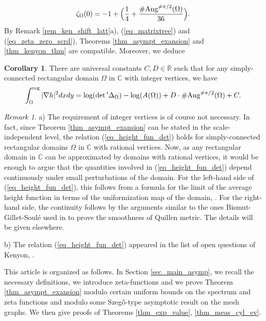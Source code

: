 \documentclass[12pt]{article}
\numberwithin{equation}{section}
\theoremstyle{theorem}
\theoremstyle{definition}
\newtheorem{cor}[thm]{Corollary}
\theoremstyle{remark}
\newtheorem{rem}[thm]{Remark}
\newcommand{\comp}{\mathbb{C}}
\newcommand{\real}{\mathbb{R}}
\newcommand{\laplcomp}{\Delta}
\begin{document}
	\begin{equation}\label{eq_zeta_zero_scrd}
		\zeta_{\Omega}(0) = -1 + 
		\Big(
			\frac{1}{4} + \frac{\# {\rm{Ang}}^{\neq \pi/2}(\Omega)}{36}
		\Big).
	\end{equation}
	By Remark \ref{rem_ken_shift_latt}a), (\ref{eq_matrixtree}) and (\ref{eq_zeta_zero_scrd}), Theorems \ref{thm_asympt_exansion} and \ref{thm_kenyon_thm} are compatible. Moreover, we deduce 
	\begin{cor}
		There are universal constants $C, D \in \real$ such that for any simply-connected rectangular domain $\Omega$ in $\comp$ with integer vertices, we have
		\begin{equation}\label{eq_height_fun_det}
			\int_{\Omega}^{{\rm{reg}}} | \nabla h|^2 dx dy = \log ( \det{}' \laplcomp_{\Omega} ) - \log ( A(\Omega)) + D \cdot \# {\rm{Ang}}^{\neq \pi/2}(\Omega) + C.
		\end{equation}
	\end{cor}
	\begin{rem}
		a) The requirement of integer vertices is of course not necessary. In fact, since Theorem \ref{thm_asympt_exansion} can be stated in the scale-independent level, the relation (\ref{eq_height_fun_det}) holds for simply-connected rectangular domains $\Omega$ in $\comp$ with rational vertices. Now, as any rectangular domain in $\comp$ can be approximated by domains with rational vertices, it would be enough to argue that the quantities involved in (\ref{eq_height_fun_det}) depend continuously under small perturbations of the domain.
		For the left-hand side of (\ref{eq_height_fun_det}), this follows from a formula for the limit of the average height function in terms of the uniformization map of the domain, \cite[\S 2.3]{KenyonDet}.
		For the right-hand side, the continuity follows by the arguments similar to the ones Bismut-Gillet-Soulé used in \cite[Theorem 1.6]{BGS3} to prove the smoothness of Quillen metric. The details will be given elsewhere.
		\par
		b) The relation (\ref{eq_height_fun_det}) appeared in the list of open questions of Kenyon, \cite[\S 8, question 4]{KenyonDet}.
	\end{rem}
	\par 
	This article is organized as follows. In Section \ref{sec_main_asymp}, we recall the necessary definitions, we introduce zeta-functions and we prove Theorem \ref{thm_asympt_exansion} modulo certain uniform bounds on the spectrum and zeta functions and modulo some Szegő-type asymptotic result on the mesh graphs.
	We then give proofs of Theorems \ref{thm_exp_value}, \ref{thm_meas_cyl_ev}.
\end{document}
